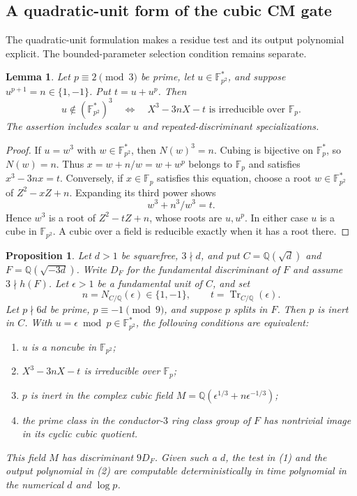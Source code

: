 \documentclass[11pt]{article}
\newtheorem{proposition}[theorem]{Proposition}
\newtheorem{lemma}[theorem]{Lemma}
\theoremstyle{definition}
\theoremstyle{remark}
\begin{document}
\subsection{A quadratic-unit form of the cubic CM gate}

The quadratic-unit formulation makes a residue test and its
output polynomial explicit.  The bounded-parameter selection
condition remains separate.

\begin{lemma}\label{lem:unit-norm-cubic}
Let $p\equiv2\pmod3$ be prime, let
$u\in\mathbb F_{p^2}^*$, and suppose
$u^{p+1}=n\in\{1,-1\}$.  Put $t=u+u^p$.
Then
\[
 u\notin(\mathbb F_{p^2}^*)^3
 \quad\Longleftrightarrow\quad
 X^3-3nX-t\text{ is irreducible over }\mathbb F_p.
\]
The assertion includes scalar $u$ and repeated-discriminant
specializations.
\end{lemma}

\begin{proof}
If $u=w^3$ with $w\in\mathbb F_{p^2}^*$, then
$N(w)^3=n$.  Cubing is bijective on $\mathbb F_p^*$,
so $N(w)=n$.  Thus $x=w+n/w=w+w^p$ belongs to
$\mathbb F_p$ and satisfies $x^3-3nx=t$.
Conversely, if $x\in\mathbb F_p$ satisfies this equation,
choose a root $w\in\mathbb F_{p^2}^*$ of
$Z^2-xZ+n$.  Expanding its third power shows
\[
 w^3+n^3/w^3=t.
\]
Hence $w^3$ is a root of $Z^2-tZ+n$, whose roots
are $u,u^p$.  In either case $u$ is a cube in
$\mathbb F_{p^2}$.  A cubic over a field is reducible
exactly when it has a root there.
\end{proof}

\begin{proposition}\label{prop:quadratic-unit-cm-gate}
Let $d>1$ be squarefree, $3\nmid d$, and put
$C=\mathbb Q(\sqrt d)$ and $F=\mathbb Q(\sqrt{-3d})$.
Write $D_F$ for the fundamental discriminant of $F$ and
assume $3\nmid h(F)$.  Let $\epsilon>1$ be a fundamental
unit of $C$, and set
\[
 n=N_{C/\mathbb Q}(\epsilon)\in\{1,-1\},
 \qquad t=\operatorname{Tr}_{C/\mathbb Q}(\epsilon).
\]
Let $p\nmid6d$ be prime, $p\equiv-1\pmod9$, and
suppose $p$ splits in $F$.  Then $p$ is inert in $C$.
With $u=\epsilon\bmod p\in\mathbb F_{p^2}^*$, the
following conditions are equivalent:
\begin{enumerate}
\item $u$ is a noncube in $\mathbb F_{p^2}$;
\item $X^3-3nX-t$ is irreducible over $\mathbb F_p$;
\item $p$ is inert in the complex cubic field
$M=\mathbb Q(\epsilon^{1/3}+n\epsilon^{-1/3})$;
\item the prime class in the conductor-$3$ ring class
group of $F$ has nontrivial image in its cyclic cubic quotient.
\end{enumerate}
This field $M$ has discriminant $9D_F$.
Given such a $d$, the test in (1) and the output polynomial
in (2) are computable deterministically in time polynomial
in the numerical $d$ and $\log p$.
\end{proposition}
\end{document}
